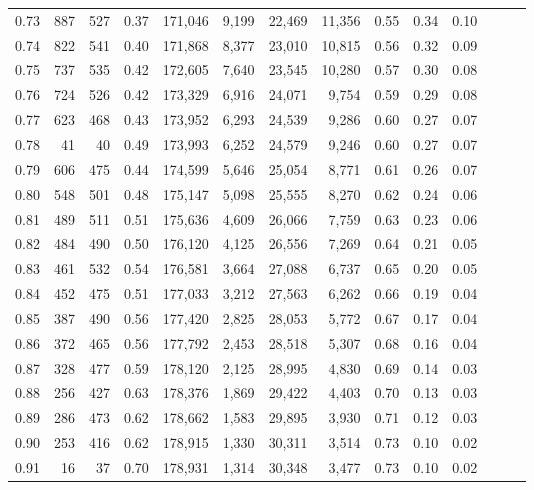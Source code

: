 \begin{tabular}{rrrrrrrrrrrrrr}
0.73 &    887 &  527 &  0.37 &  171,046 &    9,199 &  22,469 &  11,356 &  0.55 &  0.34 &      0.10 \\
0.74 &    822 &  541 &  0.40 &  171,868 &    8,377 &  23,010 &  10,815 &  0.56 &  0.32 &      0.09 \\
0.75 &    737 &  535 &  0.42 &  172,605 &    7,640 &  23,545 &  10,280 &  0.57 &  0.30 &      0.08 \\
0.76 &    724 &  526 &  0.42 &  173,329 &    6,916 &  24,071 &   9,754 &  0.59 &  0.29 &      0.08 \\
0.77 &    623 &  468 &  0.43 &  173,952 &    6,293 &  24,539 &   9,286 &  0.60 &  0.27 &      0.07 \\
0.78 &     41 &   40 &  0.49 &  173,993 &    6,252 &  24,579 &   9,246 &  0.60 &  0.27 &      0.07 \\
0.79 &    606 &  475 &  0.44 &  174,599 &    5,646 &  25,054 &   8,771 &  0.61 &  0.26 &      0.07 \\
0.80 &    548 &  501 &  0.48 &  175,147 &    5,098 &  25,555 &   8,270 &  0.62 &  0.24 &      0.06 \\
0.81 &    489 &  511 &  0.51 &  175,636 &    4,609 &  26,066 &   7,759 &  0.63 &  0.23 &      0.06 \\
0.82 &    484 &  490 &  0.50 &  176,120 &    4,125 &  26,556 &   7,269 &  0.64 &  0.21 &      0.05 \\
0.83 &    461 &  532 &  0.54 &  176,581 &    3,664 &  27,088 &   6,737 &  0.65 &  0.20 &      0.05 \\
0.84 &    452 &  475 &  0.51 &  177,033 &    3,212 &  27,563 &   6,262 &  0.66 &  0.19 &      0.04 \\
0.85 &    387 &  490 &  0.56 &  177,420 &    2,825 &  28,053 &   5,772 &  0.67 &  0.17 &      0.04 \\
0.86 &    372 &  465 &  0.56 &  177,792 &    2,453 &  28,518 &   5,307 &  0.68 &  0.16 &      0.04 \\
0.87 &    328 &  477 &  0.59 &  178,120 &    2,125 &  28,995 &   4,830 &  0.69 &  0.14 &      0.03 \\
0.88 &    256 &  427 &  0.63 &  178,376 &    1,869 &  29,422 &   4,403 &  0.70 &  0.13 &      0.03 \\
0.89 &    286 &  473 &  0.62 &  178,662 &    1,583 &  29,895 &   3,930 &  0.71 &  0.12 &      0.03 \\
0.90 &    253 &  416 &  0.62 &  178,915 &    1,330 &  30,311 &   3,514 &  0.73 &  0.10 &      0.02 \\
0.91 &     16 &   37 &  0.70 &  178,931 &    1,314 &  30,348 &   3,477 &  0.73 &  0.10 &      0.02 \\

\end{tabular}
